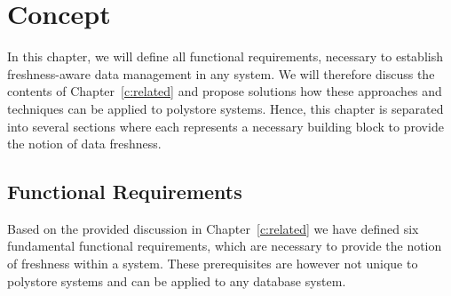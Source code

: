 \chapter{Concept}
\label{c:concept}


In this chapter, we will define all functional requirements, necessary to establish freshness-aware data management in any system.
We will therefore discuss the contents of Chapter~\ref{c:related} and propose solutions how these approaches and techniques can be applied to polystore systems.
Hence, this chapter is separated into several sections where each represents a necessary building block to provide the notion of data freshness.


\section{Functional Requirements}

Based on the provided discussion in Chapter~\ref{c:related} we have defined six fundamental functional
requirements, which are necessary to provide the notion of freshness within a system.
These prerequisites are however not unique to polystore systems and can be applied to any database system. 

